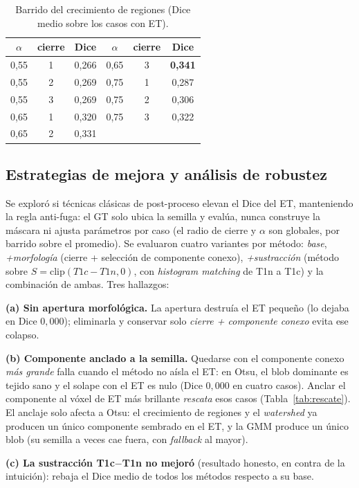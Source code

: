 \documentclass[conference]{IEEEtran}
\begin{document}
\begin{table}[h]
\centering
\caption{Barrido del crecimiento de regiones (Dice medio sobre los
casos con ET).}
\label{tab:sweep}
\begin{tabular}{ccc|ccc}
\toprule
$\alpha$ & cierre & Dice & $\alpha$ & cierre & Dice \\
\midrule
0,55 & 1 & 0,266 & 0,65 & 3 & \textbf{0,341} \\
0,55 & 2 & 0,269 & 0,75 & 1 & 0,287 \\
0,55 & 3 & 0,269 & 0,75 & 2 & 0,306 \\
0,65 & 1 & 0,320 & 0,75 & 3 & 0,322 \\
0,65 & 2 & 0,331 &      &   &       \\
\bottomrule
\end{tabular}
\end{table}

\subsection{Estrategias de mejora y análisis de robustez}
Se exploró si técnicas clásicas de post-proceso elevan el Dice del ET, manteniendo la
regla anti-fuga: el GT solo ubica la semilla y evalúa, nunca construye la máscara ni
ajusta parámetros por caso (el radio de cierre y $\alpha$ son globales, por barrido sobre
el promedio). Se evaluaron cuatro variantes por método: \emph{base}, \emph{+morfología}
(cierre + selección de componente conexo), \emph{+sustracción} (método sobre
$S=\mathrm{clip}(T1c-T1n,0)$, con \textit{histogram matching} de T1n a T1c) y la
combinación de ambas. Tres hallazgos:

\textbf{(a) Sin apertura morfológica.} La apertura destruía el ET pequeño (lo dejaba en
Dice $0{,}000$); eliminarla y conservar solo \emph{cierre + componente conexo} evita ese
colapso.

\textbf{(b) Componente anclado a la semilla.} Quedarse con el componente conexo
\emph{más grande} falla cuando el método no aísla el ET: en Otsu, el blob dominante es
tejido sano y el solape con el ET es nulo (Dice $0{,}000$ en cuatro casos). Anclar el
componente al vóxel de ET más brillante \emph{rescata} esos casos
(Tabla~\ref{tab:rescate}). El anclaje solo afecta a Otsu: el crecimiento de regiones y
el \textit{watershed} ya producen un único componente sembrado en el ET, y la GMM produce
un único blob (su semilla a veces cae fuera, con \textit{fallback} al mayor).

\textbf{(c) La sustracción T1c$-$T1n no mejoró} (resultado honesto, en contra de la
intuición): rebaja el Dice medio de todos los métodos respecto a su base.
\end{document}
